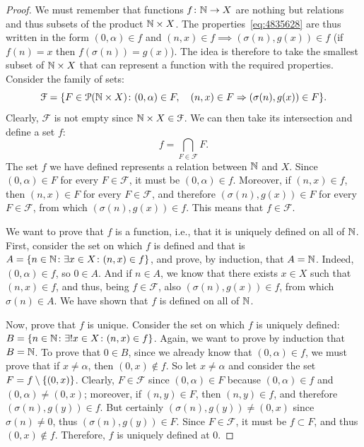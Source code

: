 \begin{proof}
We must remember that functions $f\colon {\mathbb N} \to X$ are nothing but relations 
and thus subsets of the product ${\mathbb N}\times X$.
The properties~\eqref{eq:4835628} are thus written in the form 
$(0,\alpha)\in f$ and $(n,x) \in f \implies (\sigma(n),g(x))\in f$
(if $f(n)=x$ then $f(\sigma(n))=g(x)$).
The idea is therefore to take the smallest subset of ${\mathbb N}\times X$ 
that can represent a function with the required properties.
Consider the family of sets:
\[
\mathcal F = {\left\{ F\in \mathcal P({\mathbb N}\times X)\colon 
  (0,\alpha)\in F,\quad (n,x)\in F \Rightarrow (\sigma(n),g(x))\in F \right\}}.
\]
Clearly, $\mathcal F$ is not empty since ${\mathbb N}\times X \in \mathcal F$.
We can then take its intersection and define a set $f$:
\[
  f = \bigcap_{F\in \mathcal F} F.
\]
The set $f$ we have defined represents a relation between ${\mathbb N}$ and $X$.
Since $(0,\alpha)\in F$ for every $F\in \mathcal F$, it must be 
$(0,\alpha)\in f$.
Moreover, if $(n,x)\in f$, then $(n,x)\in F$ for every $F\in \mathcal F$, 
and therefore $(\sigma(n),g(x))\in F$ for every $F\in \mathcal F$,
from which $(\sigma(n),g(x))\in f$. This means that $f\in \mathcal F$.

We want to prove that $f$ is a function, i.e., that it is uniquely defined 
on all of ${\mathbb N}$.
First, consider the set on which $f$ is defined 
and that is $A={\left\{ n\in {\mathbb N}\colon \exists x\in X\colon (n,x)\in f \right\}}$,
and prove, by induction, that $A={\mathbb N}$.
Indeed, $(0,\alpha)\in f$, so $0\in A$. 
And if $n\in A$, we know that there exists $x\in X$ such that $(n,x)\in f$, 
and thus, being $f\in \mathcal F$, also $(\sigma(n),g(x))\in f$,
from which $\sigma(n)\in A$. 
We have shown that $f$ is defined on all of ${\mathbb N}$.

Now, prove that $f$ is unique. Consider 
the set on which $f$ is uniquely defined: 
$B={\left\{ n\in {\mathbb N}\colon \exists! x\in X\colon (n,x)\in f \right\}}$.
Again, we want to prove by induction that $B={\mathbb N}$. 
To prove that $0\in B$, since we already know that $(0,\alpha)\in f$, 
we must prove that if $x\neq \alpha$, then $(0,x)\not\in f$.
So let $x\neq \alpha$ and consider 
the set $F=f\setminus{\left\{ (0,x) \right\}}$.
Clearly, $F\in \mathcal F$ since $(0,\alpha)\in F$
because $(0,\alpha)\in f$ and $(0,\alpha)\neq (0,x)$;
moreover, if $(n,y)\in F$, then $(n,y)\in f$, 
and therefore $(\sigma(n),g(y)) \in f$.
But certainly $(\sigma(n),g(y))\neq (0,x)$ since $\sigma(n)\neq 0$, 
thus $(\sigma(n),g(y))\in F$.
Since $F\in \mathcal F$, it must be $f\subset F$, and thus 
$(0,x)\not \in f$. Therefore, $f$ is uniquely defined at $0$.


\end{proof}

